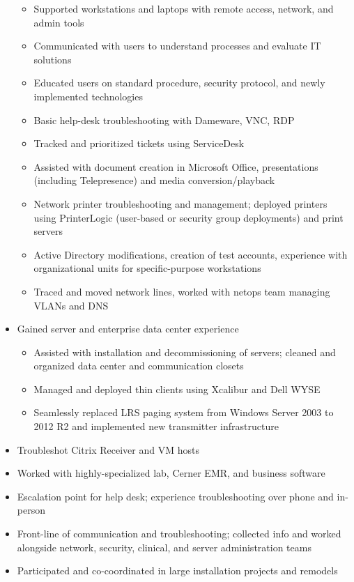 \documentclass[line]{res}
\begin{document}
\begin{resume}
\begin{itemize}
\begin{itemize}
				\item Supported workstations and laptops with remote access, network, and admin tools
				\item Communicated with users to understand processes and evaluate IT solutions
				\item Educated users on standard procedure, security protocol, and newly implemented technologies
				\item Basic help-desk troubleshooting with Dameware, VNC, RDP
				\item Tracked and prioritized tickets using ServiceDesk
				\item Assisted with document creation in Microsoft Office, presentations (including Telepresence) and media conversion/playback
				\item Network printer troubleshooting and management; deployed printers using PrinterLogic (user-based or security group deployments) and print servers
				\item Active Directory modifications, creation of test accounts, experience with organizational units for specific-purpose workstations
				\item Traced and moved network lines, worked with netops team managing VLANs and DNS
			\end{itemize}		
		\item Gained server and enterprise data center experience
			\begin{itemize}
				\item Assisted with installation and decommissioning of servers; cleaned and organized data center and communication closets
				\item Managed and deployed thin clients using Xcalibur and Dell WYSE
				\item Seamlessly replaced LRS paging system from Windows Server 2003 to 2012 R2 and implemented new transmitter infrastructure
			\end{itemize}
		\item Troubleshot Citrix Receiver and VM hosts
		\item Worked with highly-specialized lab, Cerner EMR, and business software
		\item Escalation point for help desk; experience troubleshooting over phone and in-person
		\item Front-line of communication and troubleshooting; collected info and worked alongside network, security, clinical, and server administration teams
		\item Participated and co-coordinated in large installation projects and remodels

\end{itemize}
\end{resume}
\end{document}
